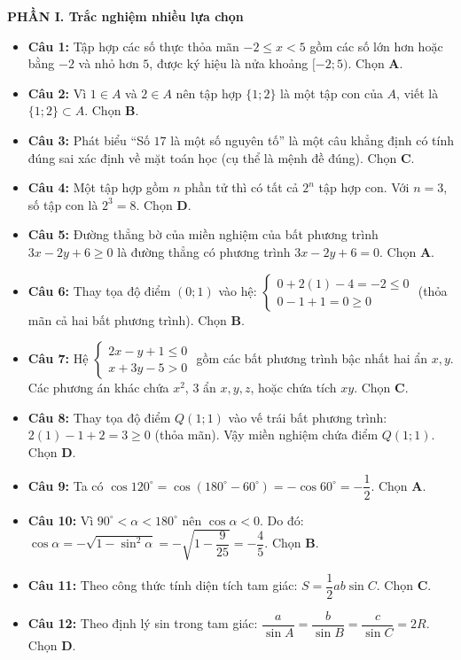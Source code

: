 \documentclass[12pt,a4paper]{article}
\begin{document}
\textbf{PHẦN I. Trắc nghiệm nhiều lựa chọn}
\begin{itemize}[leftmargin=0.6cm, itemsep=3pt]
    \item \textbf{Câu 1:} Tập hợp các số thực thỏa mãn $-2 \le x < 5$ gồm các số lớn hơn hoặc bằng $-2$ và nhỏ hơn $5$, được ký hiệu là nửa khoảng $[-2; 5)$. Chọn \textbf{A}.
    \item \textbf{Câu 2:} Vì $1 \in A$ và $2 \in A$ nên tập hợp $\{1; 2\}$ là một tập con của $A$, viết là $\{1; 2\} \subset A$. Chọn \textbf{B}.
    \item \textbf{Câu 3:} Phát biểu ``Số $17$ là một số nguyên tố'' là một câu khẳng định có tính đúng sai xác định về mặt toán học (cụ thể là mệnh đề đúng). Chọn \textbf{C}.
    \item \textbf{Câu 4:} Một tập hợp gồm $n$ phần tử thì có tất cả $2^n$ tập hợp con. Với $n = 3$, số tập con là $2^3 = 8$. Chọn \textbf{D}.
    \item \textbf{Câu 5:} Đường thẳng bờ của miền nghiệm của bất phương trình $3x - 2y + 6 \ge 0$ là đường thẳng có phương trình $3x - 2y + 6 = 0$. Chọn \textbf{A}.
    \item \textbf{Câu 6:} Thay tọa độ điểm $(0; 1)$ vào hệ:
    $\begin{cases} 0 + 2(1) - 4 = -2 \le 0 \\ 0 - 1 + 1 = 0 \ge 0 \end{cases}$ (thỏa mãn cả hai bất phương trình). Chọn \textbf{B}.
    \item \textbf{Câu 7:} Hệ $\begin{cases} 2x - y + 1 \le 0 \\ x + 3y - 5 > 0 \end{cases}$ gồm các bất phương trình bậc nhất hai ẩn $x, y$. Các phương án khác chứa $x^2$, 3 ẩn $x, y, z$, hoặc chứa tích $xy$. Chọn \textbf{C}.
    \item \textbf{Câu 8:} Thay tọa độ điểm $Q(1; 1)$ vào vế trái bất phương trình: $2(1) - 1 + 2 = 3 \ge 0$ (thỏa mãn). Vậy miền nghiệm chứa điểm $Q(1; 1)$. Chọn \textbf{D}.
    \item \textbf{Câu 9:} Ta có $\cos 120^\circ = \cos(180^\circ - 60^\circ) = -\cos 60^\circ = -\dfrac{1}{2}$. Chọn \textbf{A}.
    \item \textbf{Câu 10:} Vì $90^\circ < \alpha < 180^\circ$ nên $\cos \alpha < 0$. Do đó:
    $\cos \alpha = -\sqrt{1 - \sin^2 \alpha} = -\sqrt{1 - \dfrac{9}{25}} = -\dfrac{4}{5}$. Chọn \textbf{B}.
    \item \textbf{Câu 11:} Theo công thức tính diện tích tam giác: $S = \dfrac{1}{2}ab \sin C$. Chọn \textbf{C}.
    \item \textbf{Câu 12:} Theo định lý sin trong tam giác: $\dfrac{a}{\sin A} = \dfrac{b}{\sin B} = \dfrac{c}{\sin C} = 2R$. Chọn \textbf{D}.
\end{itemize}
\end{document}
